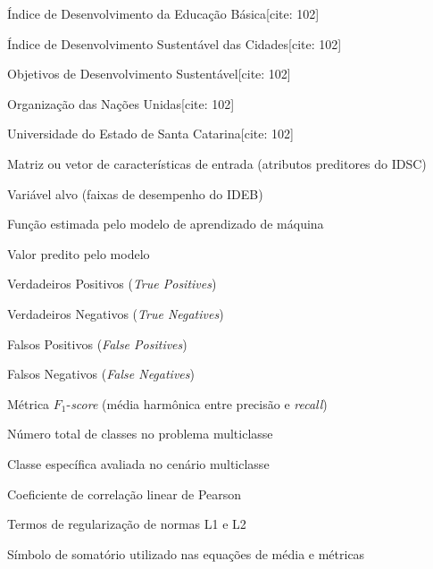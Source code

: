 
\listoffigures*
\cleardoublepage



\listoftables*
\cleardoublepage

\begin{siglas}
	\item[IDEB] Índice de Desenvolvimento da Educação Básica[cite: 102]
	\item[IDSC] Índice de Desenvolvimento Sustentável das Cidades[cite: 102]
	\item[ODS] Objetivos de Desenvolvimento Sustentável[cite: 102]
	\item[ONU] Organização das Nações Unidas[cite: 102]
	\item[UDESC] Universidade do Estado de Santa Catarina[cite: 102]
\end{siglas}



\begin{simbolos}
	\item[$X$] Matriz ou vetor de características de entrada (atributos preditores do IDSC)
	\item[$Y$] Variável alvo (faixas de desempenho do IDEB)
	\item[$\hat{f}(X)$] Função estimada pelo modelo de aprendizado de máquina
	\item[$\hat{y}$] Valor predito pelo modelo
	\item[$TP$] Verdadeiros Positivos (\textit{True Positives})
	\item[$TN$] Verdadeiros Negativos (\textit{True Negatives})
	\item[$FP$] Falsos Positivos (\textit{False Positives})
	\item[$FN$] Falsos Negativos (\textit{False Negatives})
	\item[$F1$] Métrica $F_1$-\textit{score} (média harmônica entre precisão e \textit{recall})
	\item[$K$] Número total de classes no problema multiclasse
	\item[$c$] Classe específica avaliada no cenário multiclasse
	\item[$r$] Coeficiente de correlação linear de Pearson
	\item[$L_1, L_2$] Termos de regularização de normas L1 e L2
	\item[$\sum$] Símbolo de somatório utilizado nas equações de média e métricas
\end{simbolos}


